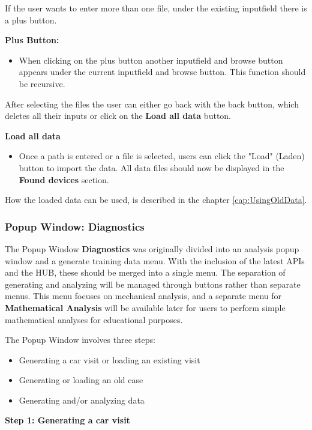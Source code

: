 \documentclass[]{scrreprt}
\begin{document}
If the user wants to enter more than one file, under the existing inputfield there is a plus button.


\textbf{Plus Button:}
\begin{itemize}
   \item When clicking on the plus button another inputfield and browse button appears under the current inputfield and browse button. This function should be recursive.
\end{itemize}


After selecting the files the user can either go back with the back button, which deletes all their inputs or click on the \textbf{Load all data} button.


\textbf{Load all data}
\begin{itemize}
    \item Once a path is entered or a file is selected, users can click the "Load" (Laden) button to import the data.
    All data files should now be displayed in the \textbf{Found devices} section.
\end{itemize}


How the loaded data can be used, is described in the chapter \ref{cap:UsingOldData}.


\subsubsection{Popup Window: Diagnostics}


The Popup Window \textbf{Diagnostics} was originally divided into an analysis popup window and a generate training data menu. With the inclusion of the latest APIs and the HUB, these should be merged into a single menu.
 The separation of generating and analyzing will be managed through buttons rather than separate menus. This menu focuses on mechanical analysis,
 and a separate menu for \textbf{Mathematical Analysis} will be available later for users to perform simple mathematical analyses for educational purposes.


The Popup Window involves three steps:


\begin{itemize}
    \item Generating a car visit or loading an existing visit
    \item Generating or loading an old case
    \item Generating and/or analyzing data
\end{itemize}


\textbf{Step 1: Generating a car visit}
\end{document}

